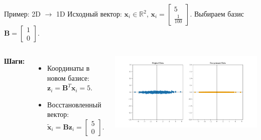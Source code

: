 \begin{frame}{Пример: 2D \(\to\) 1D}
    Исходный вектор: $\boldsymbol{x}_i \in \mathbb{R}^2$, $\boldsymbol{x}_i = \begin{bmatrix} 5 \\ \frac{1}{100} \end{bmatrix}$.
    Выбираем базис $\mathbf{B} = \begin{bmatrix} 1 \\ 0 \end{bmatrix}$.

    \begin{columns}
        \textbf{Шаги:}
        \begin{itemize}
            \item Координаты в новом базисе: $\boldsymbol{z}_i = \mathbf{B}^T\boldsymbol{x}_i = 5.$
            \item Восстановленный вектор: $\tilde{\boldsymbol{x}}_i = \mathbf{B}\boldsymbol{z}_i = \begin{bmatrix} 5 \\ 0 \end{bmatrix}.$
        \end{itemize}

        \begin{center}
            \includegraphics[width=1\textwidth]{../resources/pca/simple_example_both.png}
        \end{center}
    \end{columns}
\end{frame}

